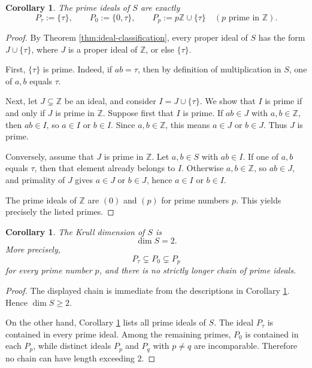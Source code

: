 \documentclass[11pt]{article}
\newtheorem{corollary}[theorem]{Corollary}
\theoremstyle{definition}
\newcommand{\Z}{\mathbb Z}
\newcommand{\taup}{\tau}
\begin{document}
\begin{corollary}\label{cor:prime-ideals}
The prime ideals of \(S\) are exactly
\[
P_{\taup}:=\{\taup\},
\qquad
P_0:=\{0,\taup\},
\qquad
P_p:=p\Z\cup\{\taup\}\quad (p\text{ prime in }\Z).
\]
\end{corollary}

\begin{proof}
By Theorem \ref{thm:ideal-classification}, every proper ideal of \(S\) has the form \(J\cup\{\taup\}\), where \(J\) is a proper ideal of \(\Z\), or else \(\{\taup\}\).

First, \(\{\taup\}\) is prime.  Indeed, if \(ab=\taup\), then by definition of multiplication in \(S\), one of \(a,b\) equals \(\taup\).

Next, let \(J\subsetneq \Z\) be an ideal, and consider \(I=J\cup\{\taup\}\).  We show that \(I\) is prime if and only if \(J\) is prime in \(\Z\).  Suppose first that \(I\) is prime.  If \(ab\in J\) with \(a,b\in\Z\), then \(ab\in I\), so \(a\in I\) or \(b\in I\).  Since \(a,b\in\Z\), this means \(a\in J\) or \(b\in J\).  Thus \(J\) is prime.

Conversely, assume that \(J\) is prime in \(\Z\).  Let \(a,b\in S\) with \(ab\in I\).  If one of \(a,b\) equals \(\taup\), then that element already belongs to \(I\).  Otherwise \(a,b\in\Z\), so \(ab\in J\), and primality of \(J\) gives \(a\in J\) or \(b\in J\), hence \(a\in I\) or \(b\in I\).

The prime ideals of \(\Z\) are \((0)\) and \((p)\) for prime numbers \(p\).  This yields precisely the listed primes.
\end{proof}

\begin{corollary}\label{cor:dim-two}
The Krull dimension of \(S\) is
\[
\dim S=2.
\]
More precisely,
\[
P_{\taup}\subsetneq P_0\subsetneq P_p
\]
for every prime number \(p\), and there is no strictly longer chain of prime ideals.
\end{corollary}

\begin{proof}
The displayed chain is immediate from the descriptions in Corollary \ref{cor:prime-ideals}.  Hence \(\dim S\ge 2\).

On the other hand, Corollary \ref{cor:prime-ideals} lists all prime ideals of \(S\).  The ideal \(P_{\taup}\) is contained in every prime ideal.  Among the remaining primes, \(P_0\) is contained in each \(P_p\), while distinct ideals \(P_p\) and \(P_q\) with \(p\neq q\) are incomparable.  Therefore no chain can have length exceeding \(2\).
\end{proof}
\end{document}
